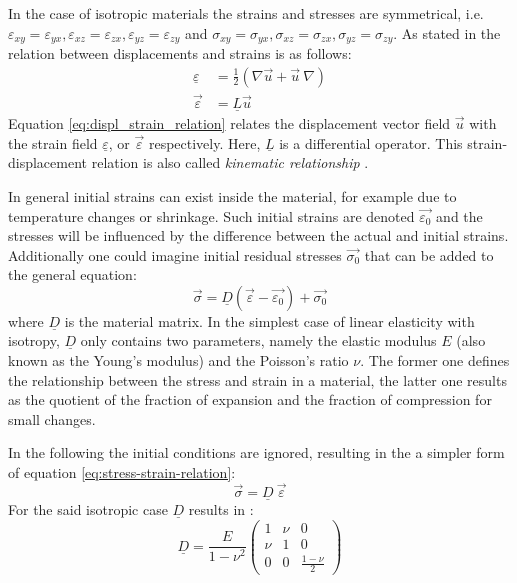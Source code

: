  In the case of isotropic materials the strains and stresses are symmetrical, i.e. $\varepsilon_{xy} = \varepsilon_{yx}, \varepsilon_{xz} = \varepsilon_{zx}, \varepsilon_{yz} = \varepsilon_{zy}$ and $\sigma_{xy} = \sigma_{yx}, \sigma_{xz} = \sigma_{zx}, \sigma_{yz} = \sigma_{zy}$. As stated in \cite{steinke2005finite} the relation between displacements and strains is as follows:
 \begin{align}\label{eq:displ_strain_relation}
 \underline{\varepsilon} &= \frac{1}{2}\left(\nabla\vec{u} + \vec{u}\:\nabla \right) \\
 \vec{\varepsilon} &= \underline{L}\vec{u} \nonumber
 \end{align}
 Equation \eqref{eq:displ_strain_relation} relates the displacement vector field $\vec{u}$ with the strain field $\underline{\varepsilon}$, or $\vec{\varepsilon}$ respectively. Here, $\underline{L}$ is a differential operator. This strain-displacement relation is also called \textit{kinematic relationship} \cite{steinke2005finite}.
 
 In general initial strains can exist inside the material, for example due to temperature changes or shrinkage. Such initial strains are denoted $\vec{\varepsilon_0}$ and the stresses will be influenced by the difference between the actual and initial strains. Additionally one could imagine initial residual stresses $\vec{\sigma_0}$ that can be added to the general equation:
 \begin{equation}\label{eq:stress-strain-relation}
 \vec{\sigma} = \underline{D}\left(\vec{\varepsilon}-\vec{\varepsilon_0}\right)+\vec{\sigma_0}
 \end{equation}
 where $\underline{D}$ is the material matrix. In the simplest case of linear elasticity with isotropy, $\underline{D}$ only contains two parameters, namely the elastic modulus $E$ (also known as the Young's modulus) and the Poisson's ratio $\nu$. The former one defines the relationship between the stress and strain in a material, the latter one results as the quotient of the fraction of expansion and the fraction of compression for small changes.
 
 In the following the initial conditions are ignored, resulting in the a simpler form of equation \eqref{eq:stress-strain-relation}:
 \begin{equation}
 \vec{\sigma} = \underline{D}\ \vec{\varepsilon}
 \end{equation}
 For the said isotropic case $\underline{D}$ results in \cite{zienkiewicz2000finite}:
 \begin{equation}
 \underline{D} = \frac{E}{1-\nu^2}\begin{pmatrix}
 1 & \nu & 0 \\
 \nu & 1 & 0 \\
 0 & 0 & \frac{1-\nu}{2}
 \end{pmatrix}
 \end{equation}
 
